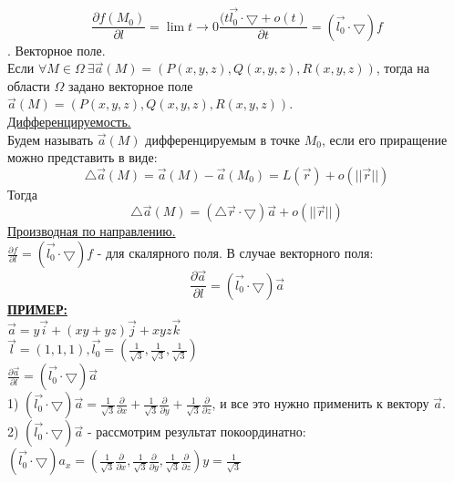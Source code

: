 \documentclass[12pt]{article}
\begin{document}
$$\frac{\partial f (M_0)}{\partial l} = \lim{t\to 0} \frac{(t \overrightarrow{l_0} \cdot \bigtriangledown + o(t)}{\partial t} = (\overrightarrow{l_0} \cdot \bigtriangledown)f$$
. Векторное поле.\\
Если $\forall M \in \Omega \ \exists \overrightarrow{a}(M) = (P(x,y,z),Q(x,y,z),R(x,y,z))$, тогда на области $\Omega$ задано векторное поле $\overrightarrow{a}(M) = (P(x,y,z),Q(x,y,z),R(x,y,z))$.\\
\uline{Дифференцируемость.}\\
Будем называть $\overrightarrow{a}(M)$ дифференцируемым в точке $M_0$, если его приращение можно представить в виде:\\
$${\bigtriangleup \overrightarrow{a}(M)} = \overrightarrow{a}(M) - \overrightarrow{a}(M_0) = L(\overrightarrow{r})+o(||\overrightarrow{r}||)$$
Тогда\\
$${\bigtriangleup \overrightarrow{a}(M)} = ({\bigtriangleup \overrightarrow{r}} \cdot \bigtriangledown)\overrightarrow{a} + o(||\overrightarrow{r}||)$$
\uline{Производная по направлению.}\\
$\frac{\partial f}{\partial l} = (\overrightarrow{l_0} \cdot \bigtriangledown)f$ - для скалярного поля. В случае векторного поля:\\
$$\frac{\partial \overrightarrow{a}}{\partial l} = (\overrightarrow{l_0} \cdot \bigtriangledown)\overrightarrow{a}$$
\uline{\textbf{ПРИМЕР:}}\\
$\overrightarrow{a} = y \overrightarrow{i} + (xy + yz)\overrightarrow{j} + xyz \overrightarrow{k}$\\
$\overrightarrow{l} = (1,1,1), \overrightarrow{l_0} = (\frac{1}{\sqrt{3}},\frac{1}{\sqrt{3}},\frac{1}{\sqrt{3}})$\\
$\frac{\partial \overrightarrow{a}}{\partial l} = (\overrightarrow{l_0} \cdot \bigtriangledown)\overrightarrow{a}$\\
1) $(\overrightarrow{l_0} \cdot \bigtriangledown)\overrightarrow{a} = \frac{1}{\sqrt{3}} \frac{\partial}{\partial x} + \frac{1}{\sqrt{3}} \frac{\partial}{\partial y} + \frac{1}{\sqrt{3}} \frac{\partial}{\partial z}$, и все это нужно применить к вектору $\overrightarrow{a}$.\\
2) $(\overrightarrow{l_0} \cdot \bigtriangledown)\overrightarrow{a}$ - рассмотрим результат покоординатно:\\
$(\overrightarrow{l_0} \cdot \bigtriangledown)a_x = (\frac{1}{\sqrt{3}} \frac{\partial}{\partial x},\frac{1}{\sqrt{3}} \frac{\partial}{\partial y},\frac{1}{\sqrt{3}} \frac{\partial}{\partial z})y = \frac{1}{\sqrt{3}}$\\
\end{document}
